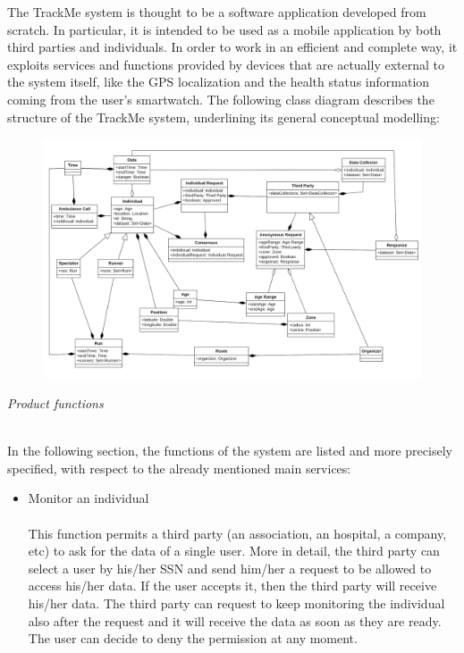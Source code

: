 \documentclass{article}
\begin{document}
\begin{legal}
\begin{legal}
			{\normalfont
The TrackMe system is thought to be a software application developed from scratch. In particular, it is intended to be used as a mobile application by both third parties and individuals.
In order to work in an efficient and complete way, it exploits services and functions provided by devices that are actually external to the system itself, like the GPS 				localization and the health status information coming from the user’s smartwatch.
The following class diagram describes the structure of the TrackMe system, underlining its general conceptual modelling:
			}
			\begin{figure}[H]
  			\includegraphics[width=\linewidth]{./images/UML1-0.png}
			\end{figure}
		\item \textit{Product functions} \\\\
		{\normalfont
In the following section, the functions of the system are listed and more precisely specified, with
respect to the already mentioned main services:
		\begin{itemize}
		\item Monitor an individual\\\\
		This function permits a third party (an association, an hospital, a company, etc) to ask for the data of a single user. More in detail, the third party can select a user by his/her SSN and send him/her a request to be allowed to access his/her data. If the user accepts it, then the third party will receive his/her data. The third party can request to keep monitoring the individual also after the request and it will receive the data as soon as they are ready. The user can decide to deny the permission at any moment. \\

\end{itemize}}
\end{legal}
\end{legal}
\end{document}
